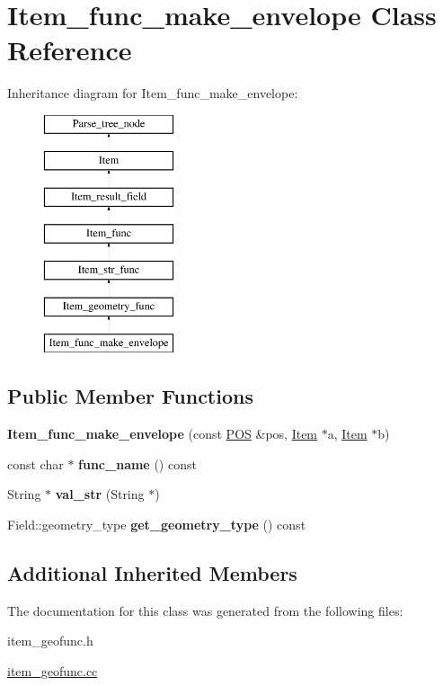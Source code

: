 \hypertarget{classItem__func__make__envelope}{}\section{Item\+\_\+func\+\_\+make\+\_\+envelope Class Reference}
\label{classItem__func__make__envelope}
Inheritance diagram for Item\+\_\+func\+\_\+make\+\_\+envelope\+:\begin{figure}[H]
\begin{center}
\leavevmode
\includegraphics[height=7.000000cm]{classItem__func__make__envelope}
\end{center}
\end{figure}
\subsection*{Public Member Functions}
\begin{DoxyCompactItemize}
\item 
\mbox{\label{classItem__func__make__envelope_a9c7ac72393e397e666339b67ac8d7d2b}} 
{\bfseries Item\+\_\+func\+\_\+make\+\_\+envelope} (const \mbox{\hyperlink{structYYLTYPE}{P\+OS}} \&pos, \mbox{\hyperlink{classItem}{Item}} $\ast$a, \mbox{\hyperlink{classItem}{Item}} $\ast$b)
\item 
\mbox{\label{classItem__func__make__envelope_aef07a1c0594e432f1d2a7feeb5726958}} 
const char $\ast$ {\bfseries func\+\_\+name} () const
\item 
\mbox{\label{classItem__func__make__envelope_af406cdf20d5bf57e18aa937982af81be}} 
String $\ast$ {\bfseries val\+\_\+str} (String $\ast$)
\item 
\mbox{\label{classItem__func__make__envelope_a39c92bbbd00212ff198cb6e8537f3607}} 
Field\+::geometry\+\_\+type {\bfseries get\+\_\+geometry\+\_\+type} () const
\end{DoxyCompactItemize}
\subsection*{Additional Inherited Members}


The documentation for this class was generated from the following files\+:\begin{DoxyCompactItemize}
\item 
item\+\_\+geofunc.\+h\item 
\mbox{\hyperlink{item__geofunc_8cc}{item\+\_\+geofunc.\+cc}}\end{DoxyCompactItemize}
